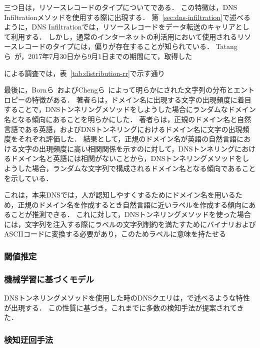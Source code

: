 三つ目は，リソースレコードのタイプについてである．
この特徴は，DNS Infiltrationメソッドを使用する際に出現する．
第~\ref{sec:dns-infiltration}で述べるように，DNS Infiltrationでは，リソースレコードをデータ転送のキャリアとして利用する．
しかし，通常のインターネットの利活用において使用されるリソースレコードのタイプには，偏りが存在することが知られている．
Tatangら~\cite{tatang}が，2017年7月30日から9月1日までの期間にて，取得した



による調査では，表~\ref{tab:distribution-rr}で示す通り


最後に，Bornら~\cite{born}およびChengら~\cite{cheng}によって明らかにされた文字列の分布とエントロピーの特徴がある．
著者らは，ドメイン名に出現する文字の出現頻度に着目することで，DNSトンネリングメソッドをしようした場合にランダムなドメイン名となる傾向にあることを明らかにした．
著者らは，正規のドメイン名と自然言語である英語，およびDNSトンネリングにおけるドメイン名に文字の出現頻度をそれぞれ評価した．
結果として，正規のドメイン名が英語の自然言語における文字の出現頻度に高い相関関係を示すのに対して，DNSトンネリングにおけるドメイン名と英語には相関がないことから，DNSトンネリングメソッドをしようした場合，ランダムな文字列で構成されるドメイン名となる傾向であることを示している．

これは，本来DNSでは，人が認知しやすくするためにドメイン名を用いるため，正規のドメイン名を作成するとき自然言語に近いラベルを作成する傾向にあることが推測できる．
これに対して，DNSトンネリングメソッドを使った場合には，文字列を注入する際にラベルの文字列制約を満たすためにバイナリおよびASCIIコードに変換する必要があり，このためラベルに意味を持たせる


\subsubsection{閾値推定}
\subsubsection{機械学習に基づくモデル}
DNSトンネリングメソッドを使用した時のDNSクエリは，で述べるような特性が出現する．
この性質に基づき，これまでに多数の検知手法が提案されてきた．

\subsubsection{検知迂回手法}
